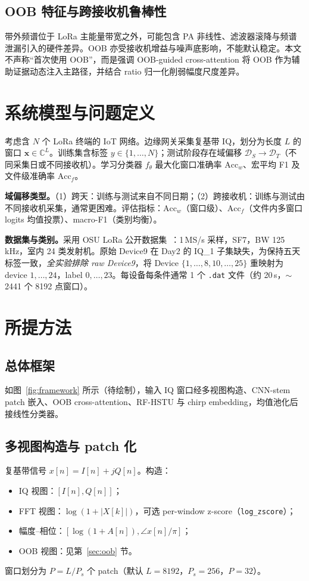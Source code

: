 \documentclass[journal]{IEEEtran}
\begin{document}
\subsection{OOB 特征与跨接收机鲁棒性}
带外频谱位于 LoRa 主能量带宽之外，可能包含 PA 非线性、滤波器滚降与频谱泄漏引入的硬件差异。OOB 亦受接收机增益与噪声底影响，不能默认稳定。本文不声称“首次使用 OOB”，而是强调 OOB-guided cross-attention 将 OOB 作为辅助证据动态注入主路径，并结合 ratio 归一化削弱幅度尺度差异。

\section{系统模型与问题定义}

考虑含 $N$ 个 LoRa 终端的 IoT 网络。边缘网关采集复基带 IQ，划分为长度 $L$ 的窗口 $\mathbf{x}\in\mathbb{C}^{L}$。训练集含标签 $y\in\{1,\ldots,N\}$；测试阶段存在域偏移 $\mathcal{D}_S\rightarrow\mathcal{D}_T$（不同采集日或不同接收机）。学习分类器 $f_\theta$ 最大化窗口准确率 $\mathrm{Acc}_w$、宏平均 F1 及文件级准确率 $\mathrm{Acc}_f$。

\textbf{域偏移类型。}（1）跨天：训练与测试来自不同日期；（2）跨接收机：训练与测试由不同接收机采集，通常更困难。评估指标：$\mathrm{Acc}_w$（窗口级）、$\mathrm{Acc}_f$（文件内多窗口 logits 均值投票）、macro-F1（类别均衡）。

\textbf{数据集与类别。}采用 OSU LoRa 公开数据集~\cite{osu_lora_dataset}：1\,MS/s 采样，SF7，BW 125\,kHz，室内 24 类发射机。原始 Device9 在 Day2 的 IQ\_1 子集缺失，为保持五天标签一致，\emph{全实验排除 raw Device9}，将 Device $\{1,\ldots,8,10,\ldots,25\}$ 重映射为 device $1,\ldots,24$，label $0,\ldots,23$。每设备每条件通常 1 个 \texttt{.dat} 文件（约 20\,s，$\sim$2441 个 8192 点窗口）。

\section{所提方法}

\subsection{总体框架}
如图~\ref{fig:framework} 所示（待绘制），输入 IQ 窗口经多视图构造、CNN-stem patch 嵌入、OOB cross-attention、RF-HSTU 与 chirp embedding，均值池化后接线性分类器。

\subsection{多视图构造与 patch 化}
复基带信号 $x[n]=I[n]+jQ[n]$。构造：
\begin{itemize}
  \item IQ 视图：$[I[n],Q[n]]$；
  \item FFT 视图：$\log(1+|X[k]|)$，可选 per-window z-score（\texttt{log\_zscore}）；
  \item 幅度--相位：$[\log(1+A[n]),\angle x[n]/\pi]$；
  \item OOB 视图：见第~\ref{sec:oob} 节。
\end{itemize}
窗口划分为 $P=L/P_s$ 个 patch（默认 $L=8192$，$P_s=256$，$P=32$）。
\end{document}
